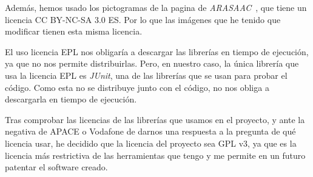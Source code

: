 Además, hemos usado los pictogramas de la pagina de \textit{ARASAAC}~\cite{arasaac}, que tiene un licencia CC BY-NC-SA 3.0 ES. Por lo que las imágenes que he tenido que modificar tienen esta misma licencia.

El uso licencia EPL nos obligaría a descargar las librerías en tiempo de ejecución, ya que no nos permite distribuirlas. Pero, en nuestro caso, la única librería que usa la licencia EPL es \textit{JUnit}, una de las librerías que se usan para probar el código. Como esta no se distribuye junto con el código, no nos obliga a descargarla en tiempo de ejecución.

Tras comprobar las licencias de las librerías que usamos en el proyecto, y ante la negativa de APACE o Vodafone de darnos una respuesta a la pregunta de qué licencia usar, he decidido que la licencia del proyecto sea GPL v3, ya que es la licencia más restrictiva de las herramientas que tengo y me permite en un futuro patentar el software creado.